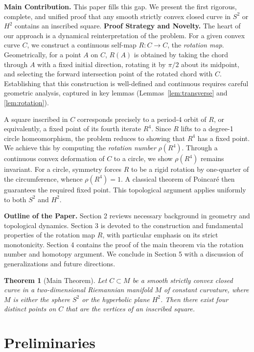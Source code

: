\documentclass{article}
\newtheorem{theorem}{Theorem}[section]
\begin{document}
\textbf{Main Contribution.} This paper fills this gap. We present the first rigorous, complete, and unified proof that any smooth strictly convex closed curve in $S^2$ or $H^2$ contains an inscribed square.
\textbf{Proof Strategy and Novelty.} The heart of our approach is a dynamical reinterpretation of the problem. For a given convex curve $C$, we construct a continuous self-map $R: C \to C$, the \emph{rotation map}. Geometrically, for a point $A$ on $C$, $R(A)$ is obtained by taking the chord through $A$ with a fixed initial direction, rotating it by $\pi/2$ about its midpoint, and selecting the forward intersection point of the rotated chord with $C$. Establishing that this construction is well-defined and continuous requires careful geometric analysis, captured in key lemmas (Lemmas~\ref{lem:transverse} and \ref{lem:rotation}).

A square inscribed in $C$ corresponds precisely to a period-4 orbit of $R$, or equivalently, a fixed point of its fourth iterate $R^4$. Since $R$ lifts to a degree-1 circle homeomorphism, the problem reduces to showing that $R^4$ has a fixed point. We achieve this by computing the \emph{rotation number} $\rho(R^4)$. Through a continuous convex deformation of $C$ to a circle, we show $\rho(R^4)$ remains invariant. For a circle, symmetry forces $R$ to be a rigid rotation by one-quarter of the circumference, whence $\rho(R^4)=1$. A classical theorem of Poincaré then guarantees the required fixed point. This topological argument applies uniformly to both $S^2$ and $H^2$.

\textbf{Outline of the Paper.} Section 2 reviews necessary background in geometry and topological dynamics. Section 3 is devoted to the construction and fundamental properties of the rotation map $R$, with particular emphasis on its strict monotonicity. Section 4 contains the proof of the main theorem via the rotation number and homotopy argument. We conclude in Section 5 with a discussion of generalizations and future directions.

\begin{theorem}[Main Theorem]\label{thm:main}
    Let $C \subset M$ be a smooth strictly convex closed curve in a two-dimensional Riemannian manifold $M$ of constant curvature, where $M$ is either the sphere $S^2$ or the hyperbolic plane $H^2$. Then there exist four distinct points on $C$ that are the vertices of an inscribed square.
\end{theorem}

\section{Preliminaries}
\end{document}

